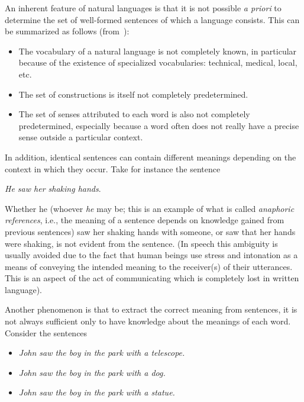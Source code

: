 An inherent feature of natural languages is that it is not possible
{\em a priori\/} to determine the set of well-formed sentences of
which a language consists. This can be summarized as follows
(from~\cite{gal}):

\begin{itemize}
  \item The vocabulary of a natural language is not completely known,
    in particular because of the existence of specialized vocabularies:
    technical, medical, local, etc.
  \item The set of constructions is itself not completely
    predetermined.
  \item The set of senses attributed to each word is also not
    completely predetermined, especially because a word often does not
    really have a precise sense outside a particular context.
\end{itemize}

In addition, identical sentences can contain different meanings
depending on the context in which they occur. Take for instance the
sentence

\begin{center}
  {\em He saw her shaking hands}.
\end{center}

Whether he (whoever {\em he\/} may be; this is an example of what is
called {\em anaphoric references\/}, i.e., the meaning of a sentence
depends on knowledge gained from previous sentences) saw her shaking
hands with someone, or saw that her hands were shaking, is not evident
from the sentence. (In speech this ambiguity is usually avoided due to
the fact that human beings use stress and intonation as a means of
conveying the intended meaning to the receiver(s) of their utterances.
This is an aspect of the act of communicating which is completely lost
in written language).

Another phenomenon is that to extract the correct meaning from
sentences, it is not always sufficient only to have knowledge about
the meanings of each word. Consider the sentences

\begin{itemize}
  \item {\em John saw the boy in the park with a telescope.}
  \item {\em John saw the boy in the park with a dog.}
  \item {\em John saw the boy in the park with a statue.}
\end{itemize}

